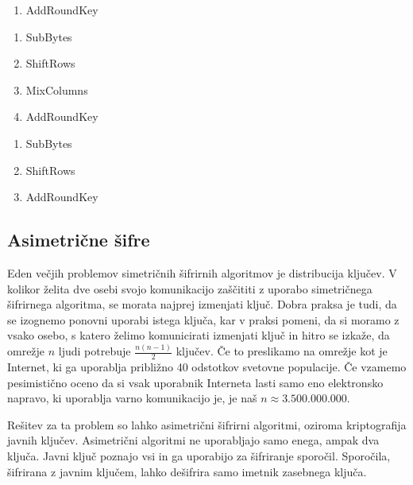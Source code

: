 \documentclass[12pt,a4paper,openany]{book}
\begin{document}
\begin{description}[style=nextline]
	\item[KeyExpansions]

	\item[Prvi krog]
		\begin{enumerate}
			\item AddRoundKey
		\end{enumerate}
	\item[Vmesni krogi]
		\begin{enumerate}
			\item SubBytes
			\item ShiftRows
			\item MixColumns
			\item AddRoundKey
		\end{enumerate}

	\item[Zadnji krogi]
		\begin{enumerate}
			\item SubBytes
			\item ShiftRows
			\item AddRoundKey
		\end{enumerate}

\end{description}

\subsection{Asimetrične šifre}

Eden večjih problemov simetričnih šifrirnih algoritmov je distribucija ključev. V kolikor želita dve osebi svojo komunikacijo zaščititi z uporabo simetričnega šifrirnega algoritma, se morata najprej izmenjati ključ. Dobra praksa je tudi, da se izognemo ponovni uporabi istega ključa, kar v praksi pomeni, da si moramo z vsako osebo, s katero želimo komunicirati izmenjati ključ in hitro se izkaže, da omrežje $n$ ljudi potrebuje $\frac{n(n-1)}{2}$ ključev. Če to preslikamo na omrežje kot je Internet, ki ga uporablja približno 40 odstotkov svetovne populacije. Če vzamemo pesimistično oceno da si vsak uporabnik Interneta lasti samo eno elektronsko napravo, ki uporablja varno komunikacijo je, je naš $n \approx 3.500.000.000$.

Rešitev za ta problem so lahko asimetrični šifrirni algoritmi, oziroma kriptografija javnih ključev. Asimetrični algoritmi ne uporabljajo samo enega, ampak dva ključa. Javni ključ poznajo vsi in ga uporabijo za šifriranje sporočil. Sporočila, šifrirana z javnim ključem, lahko dešifrira samo imetnik zasebnega ključa.
\end{document}
